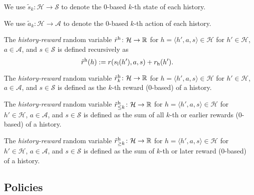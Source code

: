 \begin{definition}
  We use $\tilde{s}_k\colon \mathcal{H} \to \mathcal{S}$ to denote the 0-based $k$-th state of each history.
  \leanok
\end{definition}

\begin{definition}
  We use $\tilde{a}_k\colon \mathcal{H} \to \mathcal{A}$ to denote the 0-based $k$-th action of each history.
  \leanok
\end{definition}

\begin{definition} \label{def:reward}
The \emph{history-reward} random variable $\tilde{r}^{\mathrm{h}}\colon \mathcal{H} \to \mathbb{R}$ for $h = \langle h', a, s \rangle \in  \mathcal{H}$ for $h'\in \mathcal{H}$, $a\in \mathcal{A}$, and $s\in \mathcal{S}$ is defined recursively as
\[
\tilde{r}^{\mathrm{h}}(h) := r(s_{\mathrm{l}}(h'), a, s) + r_{\mathrm{h}}(h').
\]
 \leanok
\end{definition}

\begin{definition}\label{reward_at}
The \emph{history-reward} random variable $\tilde{r}^{\mathrm{h}}_k \colon \mathcal{H} \to \mathbb{R}$ for $h = \langle h', a, s \rangle \in  \mathcal{H}$ for $h'\in \mathcal{H}$, $a\in \mathcal{A}$, and $s\in \mathcal{S}$ is defined as the $k$-th reward (0-based) of a history.
 \leanok
\end{definition}

\begin{definition}\label{reward_to}
The \emph{history-reward} random variable $\tilde{r}^{\mathrm{h}}_{\le k} \colon \mathcal{H} \to \mathbb{R}$ for $h = \langle h', a, s \rangle \in  \mathcal{H}$ for $h'\in \mathcal{H}$, $a\in \mathcal{A}$, and $s\in \mathcal{S}$ is defined as the sum of all $k$-th or earlier rewards (0-based) of a history.
 \leanok
\end{definition}

\begin{definition}\label{reward_from}
The \emph{history-reward} random variable $\tilde{r}^{\mathrm{h}}_{\ge k}\colon \mathcal{H} \to \mathbb{R}$ for $h = \langle h', a, s \rangle \in  \mathcal{H}$ for $h'\in \mathcal{H}$, $a\in \mathcal{A}$, and $s\in \mathcal{S}$ is defined as the sum of $k$-th or later reward (0-based) of a history.
 \leanok
\end{definition}

\subsection{Policies}

